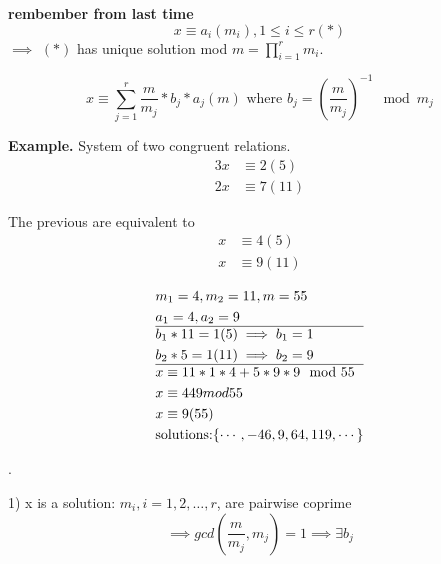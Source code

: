 

\textbf{rembember from last time}
\[
  x \equiv a_i (m_i), 1 \leq i \leq r (*)
\]
$\implies$ $(*)$ has unique solution mod $m = \prod_{i = 1}^r m_i$. 

\[
  x \equiv \sum_{j=1}^r \frac {m}{m_j} * b_j * a_j (m) \text{ where }
  b_j = \left( \frac{m}{m_j} \right) ^{-1} \mod m_j
\]

\textbf{Example.}
System of two congruent relations.
\begin{align*}
  3x &\equiv 2 (5) \\
  2x &\equiv 7 (11)
\end{align*}

The previous are equivalent to
\begin{align*}
  x &\equiv 4 (5) \\
  x &\equiv 9 (11)
\end{align*}

\begin{align*}
  &m_1 = 4, m_2 = 11, m = 55 \\
  &a_1 = 4, a_2 = 9 \\
  \hline
  &b_1 * 11 = 1 (5)  \implies b_1 = 1 \\
  &b_2 *5 = 1 (11) \implies b_2 = 9 \\
  \hline
  & x \equiv 11 * 1 * 4 + 5 *9 *9 \mod 55\\
  & x \equiv 449 mod 55 \\
  & x \equiv 9 (55) \\
  & \text{solutions:} \{\cdots, -46, 9, 64, 119, \cdots \}
\end{align*}

\Proof.

1) x is a solution: $m_i, i = 1,2, \ldots, r$, are pairwise coprime 
\[
  \implies gcd\left(\frac{m}{m_j}, m_j\right) = 1 \implies \exists b_j
\]

